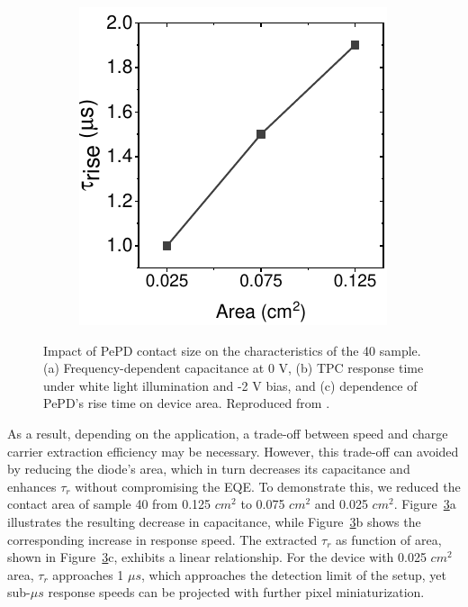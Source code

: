 \begin{figure}[htbp]
\begin{subfigure}{0.3\textwidth}
        \caption{}
        \label{}
    \end{subfigure}
    \hfill
    \begin{subfigure}{0.29\textwidth}
        \centering
        \includegraphics[width=\textwidth]{chapters/transport_layers/images/Rise_time_farea.pdf}
        \caption{}
        \label{}
    \end{subfigure}
    
    \caption[Impact of PePD contact size on the electrical characteristics of the 40 sample.]{Impact of PePD contact size on the characteristics of the 40 sample. (a) Frequency-dependent capacitance at 0 V, (b) TPC response time under white light illumination and -2 V bias, and (c) dependence of PePD's rise time on device area. Reproduced from \cite{Papadopoulou2025ElectronSpeed}.}
    \label{fig:etl_opt:dev_area}
\end{figure}

As a result, depending on the application, a trade-off between speed and charge carrier extraction efficiency may be necessary. However, this trade-off can avoided by reducing the diode's area, which in turn decreases its capacitance and enhances $\tau_r$ without compromising the EQE. To demonstrate this, we reduced the contact area of sample 40 from 0.125 $cm^2$ to 0.075 $cm^2$ and 0.025 $cm^2$. Figure~\ref{fig:etl_opt:dev_area}a illustrates the resulting decrease in capacitance, while Figure~\ref{fig:etl_opt:dev_area}b shows the corresponding increase in response speed. The extracted $\tau_r$ as function of area, shown in Figure~\ref{fig:etl_opt:dev_area}c, exhibits a linear relationship. For the device with 0.025 $cm^2$ area, $\tau_r$ approaches 1 $\mu s$, which approaches the detection limit of the setup, yet sub-$\mu s$ response speeds can be projected with further pixel miniaturization.

